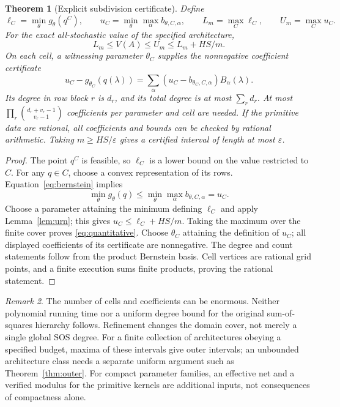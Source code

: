 \documentclass[11pt]{amsart}
\newtheorem{theorem}{Theorem}[section]
\theoremstyle{definition}\newtheorem{definition}[theorem]{Definition}
\theoremstyle{remark}\newtheorem{remark}[theorem]{Remark}
\newcommand{\1}{\mathbf 1}
\begin{document}
\begin{theorem}[Explicit subdivision certificate]\label{thm:quantitative}
Define
\[
 \ell_C=\min_\theta g_\theta(q^C),\qquad
 u_C=\min_\theta\max_\alpha b_{\theta,C,\alpha},\qquad
 L_m=\max_C\ell_C,\qquad U_m=\max_Cu_C.
\]
For the exact all-stochastic value of the specified architecture,
\begin{equation}\label{eq:quantitative}
       L_m\le V(A)\le U_m\le L_m+HS/m.
\end{equation}
On each cell, a witnessing parameter $\theta_C$ supplies the nonnegative
coefficient certificate
\[
 u_C-g_{\theta_C}(q(\lambda))
       =\sum_\alpha(u_C-b_{\theta_C,C,\alpha})B_\alpha(\lambda).
\]
Its degree in row block $r$ is $d_r$, and its total degree is at most
$\sum_rd_r$. At most
$\prod_r{d_r+v_r-1\choose v_r-1}$ coefficients per parameter and cell
are needed. If the primitive data are rational, all coefficients and
bounds can be checked by rational arithmetic. Taking $m\ge HS/\varepsilon$
gives a certified interval of length at most $\varepsilon$.
\end{theorem}
\begin{proof}
The point $q^C$ is feasible, so $\ell_C$ is a lower bound on the value
restricted to $C$. For any $q\in C$, choose a convex representation of
its rows. Equation~\eqref{eq:bernstein} implies
\[
 \min_\theta g_\theta(q)\le
 \min_\theta\max_\alpha b_{\theta,C,\alpha}=u_C.
\]
Choose a parameter attaining the minimum defining $\ell_C$ and apply
Lemma~\ref{lem:urn}; this gives $u_C\le\ell_C+HS/m$.
Taking the maximum over the finite cover proves \eqref{eq:quantitative}.
Choose $\theta_C$ attaining the definition of $u_C$; all displayed
coefficients of its certificate are nonnegative. The degree and count
statements follow from the product Bernstein basis. Cell vertices are
rational grid points, and a finite execution sums finite products, proving
the rational statement.
\end{proof}

\begin{remark}
The number of cells and coefficients can be enormous. Neither polynomial
running time nor a uniform degree bound for the original sum-of-squares
hierarchy follows. Refinement changes the domain cover, not merely a
single global SOS degree. For a finite collection of architectures obeying
a specified budget, maxima of these intervals give outer intervals; an
unbounded architecture class needs a separate uniform argument such as
Theorem~\ref{thm:outer}. For compact parameter families, an effective net
and a verified modulus for the primitive kernels are additional inputs,
not consequences of compactness alone.
\end{remark}
\end{document}
